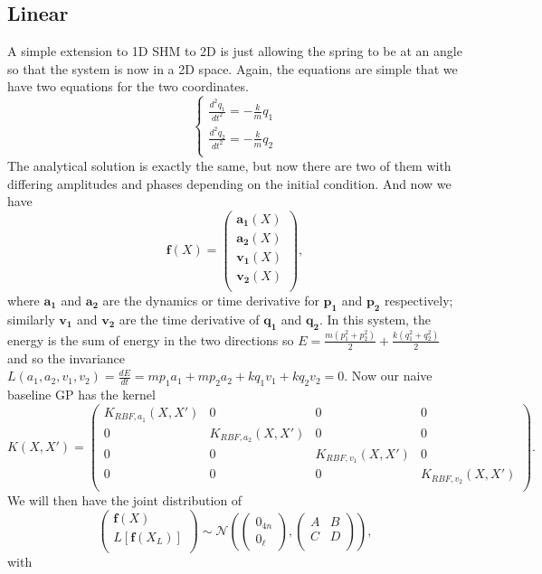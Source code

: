 \documentclass{statsmsc}
\begin{document}
\subsection{Linear}
A simple extension to 1D SHM to 2D is just allowing the spring to be at an angle so that the system is now in a 2D space.
Again, the equations are simple that we have two equations for the two coordinates.
$$
\begin{cases}
    \frac{d^2{q_1}}{dt^2} = -\frac{k}{m}q_1\\
    \frac{d^2{q_2}}{dt^2} = -\frac{k}{m}q_2\\
\end{cases}
$$
The analytical solution is exactly the same, but now there are two of them with differing amplitudes and phases depending on the initial condition. 
And now we have $$\mathbf{f}(X)=\begin{pmatrix}
    \mathbf{a_1}(X)\\
    \mathbf{a_2}(X)\\
    \mathbf{v_1}(X)\\
    \mathbf{v_2}(X)\\
\end{pmatrix},$$
where $\mathbf{a_1}$ and $\mathbf{a_2}$ are the dynamics or time derivative for $\mathbf{p_1}$ and $\mathbf{p_2}$ respectively; similarly $\mathbf{v_1}$ and $\mathbf{v_2}$ are the time derivative of $\mathbf{q_1}$ and $\mathbf{q_2}$.
In this system, the energy is the sum of energy in the two directions so $E=\frac{m(p_1^2+p_2^2)}{2}+\frac{k(q_1^2+q_2^2)}{2}$ and so the invariance $L(a_1, a_2, v_1, v_2)=\frac{dE}{dt}=mp_1a_1+mp_2a_2+kq_1v_1+kq_2v_2=0.$
Now our naive baseline GP has the kernel
$$
K(X,X')=\begin{pmatrix}
K_{RBF,a_1}(X,X') & 0 & 0 & 0 \\
0 & K_{RBF,a_2}(X,X') & 0 & 0 \\
0 & 0 & K_{RBF,v_1}(X,X') & 0 \\
0 & 0 & 0 & K_{RBF,v_2}(X,X') \\
\end{pmatrix}.
$$
We will then have the joint distribution of
$$
\begin{pmatrix}
    \mathbf{f}(X)\\L[\mathbf{f}(X_L)]\\
\end{pmatrix}
\sim\mathcal{N}
\left(
\begin{pmatrix}
    0_{4n} \\ 0_{\ell}
\end{pmatrix},
\begin{pmatrix}
    A & B \\
    C & D\\
\end{pmatrix}
\right),
$$
with 
\end{document}
